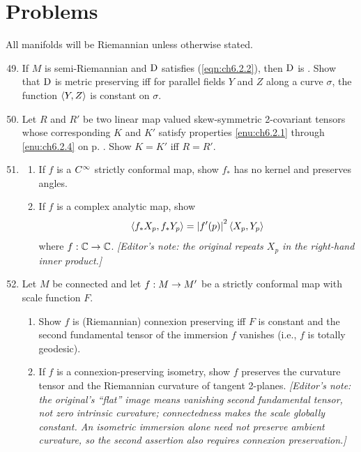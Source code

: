 \documentclass[../main]{subfiles}
\begin{document}
\section*{Problems}
All manifolds will be Riemannian unless otherwise stated.
\begin{enumerate}
\setcounter{enumi}{48}

\item\label{pro:49} If $M$ is semi-Riemannian and $\mathrm{D}$ satisfies (\ref{eqn:ch6.2.2}), then $\mathrm{D}$ is . Show that $\mathrm{D}$ is metric preserving iff for parallel fields $Y$ and $Z$ along a curve $\sigma$, the function $\left\langle Y,Z\right\rangle$ is constant on $\sigma$.

\item\label{pro:50} Let $R$ and $R'$ be two linear map valued skew-symmetric 2-covariant tensors whose corresponding $K$ and $K'$ satisfy properties \ref{enu:ch6.2.1} through \ref{enu:ch6.2.4} on p. \pageref{thm:ch6.2.2}. Show $K=K'$ iff $R=R'$.

\item\label{pro:51} 
\begin{enumerate}[label=(\roman*)]
    \item If $f$ is a $C^\infty$ strictly conformal map, show $f_*$ has no kernel and preserves angles.
    \item  If $f$ is a complex analytic map, show
    \[\left\langle f_*X_p,f_*Y_p\right\rangle=\left|f'(p)\right|^2\left\langle X_p,Y_p\right\rangle\]
    where $f:\mathbb{C}\to\mathbb{C}$. \emph{[Editor's note: the original repeats $X_p$ in the right-hand inner product.]}
\end{enumerate}


\item\label{pro:52} Let $M$ be connected and let $f:M\to M'$ be a strictly conformal map with scale function $F$.
\begin{enumerate}[label = (\roman*)]
    \item Show $f$ is (Riemannian) connexion preserving iff $F$ is constant and the second fundamental tensor of the immersion $f$ vanishes (i.e., $f$ is totally geodesic).
    \item If $f$ is a connexion-preserving isometry, show $f$ preserves the curvature tensor and the Riemannian curvature of tangent 2-planes. \emph{[Editor's note: the original's ``flat'' image means vanishing second fundamental tensor, not zero intrinsic curvature; connectedness makes the scale globally constant. An isometric immersion alone need not preserve ambient curvature, so the second assertion also requires connexion preservation.]}
\end{enumerate}


\end{enumerate}
\end{document}
